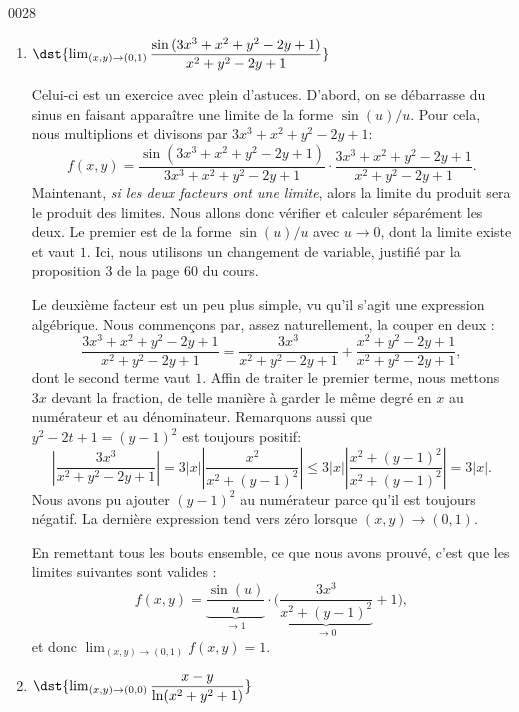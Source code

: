 \begin{corrige}{0028}
\begin{enumerate}
									    
\item  $\dst{\lim_{(x,y)\rightarrow (0,1)} \dfrac{\sin{(3x^3+x^2 + y^2 -2y+ 1)}}{x^2+y^2-2y+1}}$

	Celui-ci est un exercice avec plein d'astuces. D'abord, on se débarrasse du sinus en faisant apparaître une limite de la forme $\sin(u)/u$. Pour cela, nous multiplions et divisons par $3x^3+x^2+y^2-2y+1$:
\begin{equation}
	f(x,y)=\frac{ \sin(3x^3+x^2+y^2-2y+1) }{ 3x^3+x^2+y^2-2y+1 }\cdot\frac{ 3x^3+x^2+y^2-2y+1 }{ x^2+y^2-2y+1 }.
\end{equation}
Maintenant, \emph{si les deux facteurs ont une limite}, alors la limite du produit sera le produit des limites. Nous allons donc vérifier et calculer séparément les deux. Le premier est de la forme $\sin(u)/u$ avec $u\to 0$, dont la limite existe et vaut $1$. Ici, nous utilisons un \og changement de variable\fg{}, justifié par la proposition 3 de la page 60 du cours. 

Le deuxième facteur est un peu plus simple, vu qu'il s'agit une expression algébrique. Nous commençons par, assez naturellement, la couper en deux :
\begin{equation}
	\frac{ 3x^3+x^2+y^2-2y+1 }{ x^2+y^2-2y+1 }=\frac{ 3x^3 }{  x^2+y^2-2y+1  }+\frac{ x^2+y^2-2y+1 }{ x^2+y^2-2y+1 },
\end{equation}
dont le second terme vaut $1$. Affin de traiter le premier terme, nous mettons $3x$ devant la fraction, de telle manière à garder le même degré en $x$ au numérateur et au dénominateur. Remarquons aussi que $y^2-2t+1=(y-1)^2$ est toujours positif:
\begin{equation}
	\left|  \frac{ 3x^3 }{  x^2+y^2-2y+1  }\right|=3|x|\left|  \frac{ x^2 }{  x^2+(y-1)^2  }\right|\leq 3| x |\left|\frac{ x^2+(y-1)^2 }{  x^2+(y-1)^2  }\right|=3| x |.
\end{equation}
Nous avons pu ajouter $(y-1)^2$ au numérateur parce qu'il est toujours négatif. La dernière expression tend vers zéro lorsque $(x,y)\to(0,1)$.

En remettant tous les bouts ensemble, ce que nous avons prouvé, c'est que les limites suivantes sont valides :
\begin{equation}
	f(x,y)=\underbrace{\frac{ \sin(u) }{ u }}_{\to 1}\cdot\Big( \underbrace{\frac{ 3x^3 }{ x^2+(y-1)^2 }}_{\to 0}+1 \Big),
\end{equation}
et donc $\lim_{(x,y)\to(0,1)}f(x,y)=1$.


\item   $\dst{\lim_{(x,y)\rightarrow (0,0)} \dfrac{x-y}{\ln(x^2+y^2+1)}}$
																	    

\end{enumerate}
\end{corrige}
